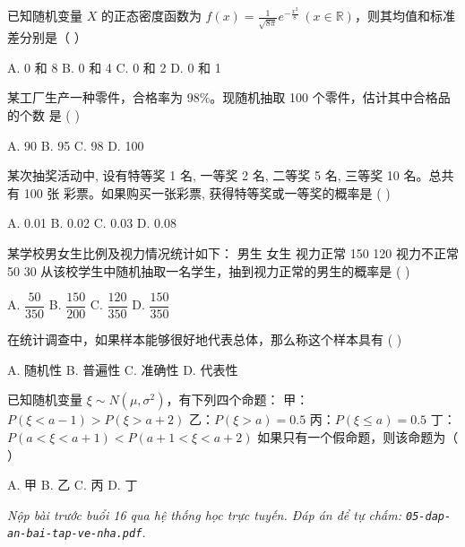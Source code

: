 \documentclass[11pt, a4paper]{article}
\begin{document}
\begin{baitap}[10]
已知随机变量 $X$ 的正态密度函数为 $f(x)=\frac{1}{\sqrt{8\pi}}e^{-\frac{x^2}{8}}\ (x\in\mathbb{R})$，则其均值和标准差分别是（ ）
\par\vspace{3pt}
\noindent A. 0 和 8 \quad B. 0 和 4 \quad C. 0 和 2 \quad D. 0 和 1
\end{baitap}

\begin{baitap}[11]
某工厂生产一种零件，合格率为 98\%。现随机抽取 100 个零件，估计其中合格品的个数 是 ( )
\par\vspace{3pt}
\noindent A. 90 \quad B. 95 \quad C. 98 \quad D. 100
\end{baitap}

\begin{baitap}[12]
某次抽奖活动中, 设有特等奖 1 名, 一等奖 2 名, 二等奖 5 名, 三等奖 10 名。总共有 100 张 彩票。如果购买一张彩票, 获得特等奖或一等奖的概率是 ( )
\par\vspace{3pt}
\noindent A. 0.01 \quad B. 0.02 \quad C. 0.03 \quad D. 0.08
\end{baitap}

\begin{baitap}[13]
某学校男女生比例及视力情况统计如下： 男生 女生 视力正常 150 120 视力不正常 50 30 从该校学生中随机抽取一名学生，抽到视力正常的男生的概率是 ( )
\par\vspace{3pt}
\noindent A. $\dfrac{50}{350}$ \quad B. $\dfrac{150}{200}$ \quad C. $\dfrac{120}{350}$ \quad D. $\dfrac{150}{350}$
\end{baitap}

\begin{baitap}[14]
在统计调查中，如果样本能够很好地代表总体，那么称这个样本具有 ( )
\par\vspace{3pt}
\noindent A. 随机性 \quad B. 普遍性 \quad C. 准确性 \quad D. 代表性
\end{baitap}

\begin{baitap}[15]
已知随机变量 $\xi \sim N(\mu, \sigma^2)$，有下列四个命题： 甲：$P(\xi < a - 1) > P(\xi > a + 2)$ 乙：$P(\xi > a) = 0.5$ 丙：$P(\xi \le a) = 0.5$ 丁：$P(a < \xi < a + 1) < P(a + 1 < \xi < a + 2)$ 如果只有一个假命题，则该命题为（ ）
\par\vspace{3pt}
\noindent A. 甲 \quad B. 乙 \quad C. 丙 \quad D. 丁
\end{baitap}

\vspace{0.3cm}
\noindent\emph{Nộp bài trước buổi 16 qua hệ thống học trực tuyến. Đáp án để tự chấm: \texttt{05-dap-an-bai-tap-ve-nha.pdf}.}
\end{document}

